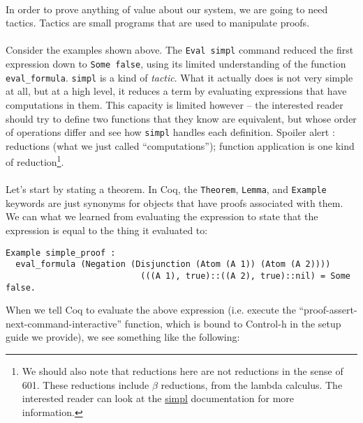 \documentclass{article}
\begin{document}
\paragraph{} In order to prove anything of value about our system, we are going to need tactics. Tactics are small programs that are used to manipulate proofs. 

\paragraph{} Consider the examples shown above. The \verb|Eval simpl| command reduced the first expression down to \verb|Some false|, using its limited understanding of the function \verb|eval_formula|. \verb|simpl| is a kind of \emph{tactic}. What it actually does is not very simple at all, but at a high level, it reduces a term by evaluating expressions that have computations in them. This capacity is limited however -- the interested reader should try to define two functions that they know are equivalent, but whose order of operations differ and see how \verb|simpl| handles each definition. Spoiler alert : reductions (what we just called ``computations''); function application is one kind of reduction\footnote{We should also note that reductions here are not reductions in the sense of 601. These reductions include \(\beta\) reductions, from the lambda calculus. The interested reader can look at the \url{simpl} documentation for more information.}.

\paragraph{} Let's start by stating a theorem. In Coq, the \verb|Theorem|, \verb|Lemma|, and \verb|Example| keywords are just synonyms for objects that have proofs associated with them. We can what we learned from evaluating the expression to state that the expression is equal to the thing it evaluated to:

\begin{lstlisting}
Example simple_proof :
  eval_formula (Negation (Disjunction (Atom (A 1)) (Atom (A 2))))
                           (((A 1), true)::((A 2), true)::nil) = Some false.
\end{lstlisting}
 
When we tell Coq to evaluate the above expression (i.e. execute the ``proof-assert-next-command-interactive'' function, which is bound to Control-h in the setup guide we provide), we see something like the following:
\end{document}

